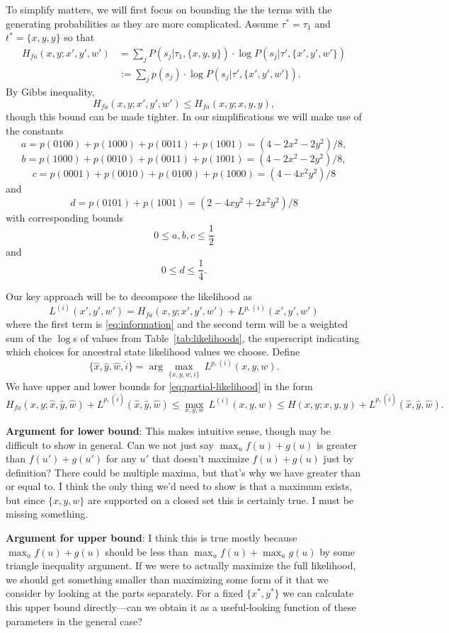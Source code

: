 \documentclass[a4paper]{article}
\begin{document}
To simplify matters, we will first focus on bounding the the terms with the generating probabilities as they are more complicated.
Assume $\tau^*=\tau_1$ and $t^*=\{x,y,y\}$ so that
\begin{align}
\label{eq:information}
H_{fa}(x, y;x', y', w') &= \sum_{j} P(s_j | \tau_1, \{x,y,y\}) \cdot \log P(s_j | \tau', \{x',y',w'\}) \nonumber \\ 
&:= \sum_{j} p(s_j) \cdot \log P(s_j | \tau', \{x',y',w'\}).
\end{align}
By Gibbs inequality,
$$
H_{fa}(x, y;x', y', w') \le H_{fa}(x, y;x, y, y),
$$
though this bound can be made tighter.
In our simplifications we will make use of the constants
$$
a = p(0100) + p(1000) + p(0011) + p(1001) = (4-2x^2-2y^2)/8,
$$
$$
b = p(1000) + p(0010) + p(0011) + p(1001) = (4-2x^2-2y^2)/8,
$$
$$
c = p(0001) + p(0010) + p(0100) + p(1000) = (4-4x^2y^2)/8
$$
and
$$
d = p(0101) + p(1001) = (2-4xy^2+2x^2y^2)/8
$$
with corresponding bounds
$$
0 \le a,b,c \le \frac{1}{2}
$$
and
$$
0 \le d \le \frac{1}{4}.
$$

Our key approach will be to decompose the likelihood as
\begin{equation}
\label{eq:partial-likelihood}
L^{(i)}(x', y', w') = H_{fa}(x,y;x',y',w') + L^{p,(i)}(x',y',w')
\end{equation}
where the first term is \eqref{eq:information} and the second term will be a weighted sum of the $\log$s of values from Table~\ref{tab:likelihoods}, the superscript indicating which choices for ancestral state likelihood values we choose.
Define
$$
\{\hat{x}, \hat{y}, \hat{w}, \hat{i}\} = \arg\max_{\{x,y,w,i\}} \ L^{p,(i)}(x,y,w).
$$
We have upper and lower bounds for \eqref{eq:partial-likelihood} in the form
$$
H_{fa}(x,y; \hat{x}, \hat{y}, \hat{w}) + L^{p,(\hat{i})}(\hat{x}, \hat{y}, \hat{w}) \le \max_{x,y,w} \ L^{(i)}(x,y,w) \le H(x,y;x,y,y) + L^{p,(\hat{i})}(\hat{x}, \hat{y}, \hat{w}).
$$

\textbf{Argument for lower bound}: This makes intuitive sense, though may be difficult to show in general.
Can we not just say $\max_u f(u) + g(u)$ is greater than $f(u') + g(u')$ for any $u'$ that doesn't maximize $f(u) + g(u)$ just by definition?
There could be multiple maxima, but that's why we have greater than or equal to.
I think the only thing we'd need to show is that a maximum exists, but since $\{x,y,w\}$ are supported on a closed set this is certainly true.
I must be missing something.

\textbf{Argument for upper bound}: I think this is true mostly because $\max_u f(u) + g(u)$ should be less than $\max_u f(u) + \max_u g(u)$ by some triangle inequality argument.
If we were to actually maximize the full likelihood, we should get something smaller than maximizing some form of it that we consider by looking at the parts separately.
For a fixed $\{x^*, y^*\}$ we can calculate this upper bound directly---can we obtain it as a useful-looking function of these parameters in the general case?
\end{document}
